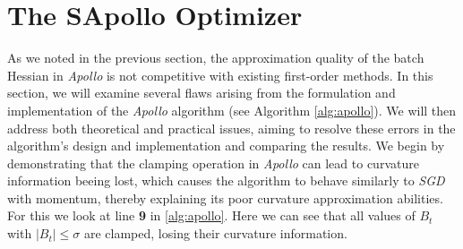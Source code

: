  
\section{The SApollo Optimizer}
As we noted in the previous section, the approximation quality of the batch Hessian in \emph{Apollo} is not competitive with existing first-order methods.
In this section, we will examine several flaws arising from the formulation and implementation of the \emph{Apollo} algorithm (see Algorithm \ref{alg:apollo}).
We will then address both theoretical and practical issues, aiming to resolve these errors in the algorithm's design and implementation and comparing
the results.
We begin by demonstrating that the clamping operation in \emph{Apollo} can lead to curvature information beeing lost,
which causes the algorithm to behave similarly to \emph{SGD} with momentum, thereby explaining its poor curvature approximation abilities.\\
For this we look at line \textbf{9} in \ref{alg:apollo}. Here we can see that all values of $B_t$ with $|B_t| \le \sigma$ are clamped,
losing their curvature information. 

